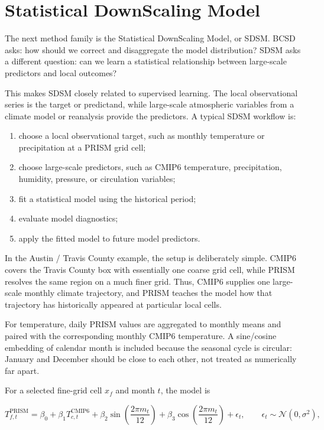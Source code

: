 \documentclass[11pt]{article}
\begin{document}
\section{Statistical DownScaling Model}

The next method family is the Statistical DownScaling Model, or SDSM. BCSD asks: how should we correct and disaggregate the model distribution? SDSM asks a different question: can we learn a statistical relationship between large-scale predictors and local outcomes?

This makes SDSM closely related to supervised learning. The local observational series is the target or predictand, while large-scale atmospheric variables from a climate model or reanalysis provide the predictors. A typical SDSM workflow is:

\begin{enumerate}
    \item choose a local observational target, such as monthly temperature or precipitation at a PRISM grid cell;
    \item choose large-scale predictors, such as CMIP6 temperature, precipitation, humidity, pressure, or circulation variables;
    \item fit a statistical model using the historical period;
    \item evaluate model diagnostics;
    \item apply the fitted model to future model predictors.
\end{enumerate}

In the Austin / Travis County example, the setup is deliberately simple. CMIP6 covers the Travis County box with essentially one coarse grid cell, while PRISM resolves the same region on a much finer grid. Thus, CMIP6 supplies one large-scale monthly climate trajectory, and PRISM teaches the model how that trajectory has historically appeared at particular local cells.

For temperature, daily PRISM values are aggregated to monthly means and paired with the corresponding monthly CMIP6 temperature. A sine/cosine embedding of calendar month is included because the seasonal cycle is circular: January and December should be close to each other, not treated as numerically far apart.

For a selected fine-grid cell $x_f$ and month $t$, the model is

\begin{equation}
T_{f,t}^{\mathrm{PRISM}}
=
\beta_0
+
\beta_1 T_{c,t}^{\mathrm{CMIP6}}
+
\beta_2 \sin\left(\frac{2\pi m_t}{12}\right)
+
\beta_3 \cos\left(\frac{2\pi m_t}{12}\right)
+
\epsilon_t,
\qquad
\epsilon_t \sim \mathcal{N}(0,\sigma^2),
\end{equation}
\end{document}
